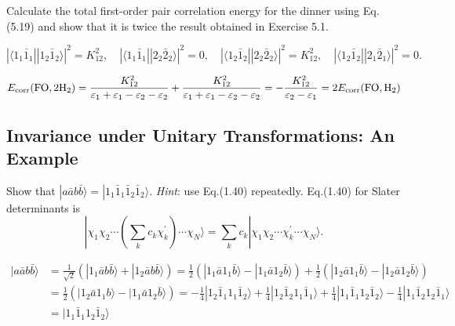 \documentclass[a4paper]{book}
\newcommand{\corr}{{\rm corr}}
\begin{document}
	\begin{exercise}
	Calculate the total first-order pair correlation energy for the dinner using Eq.(5.19) and show that it is twice the result obtained  in Exercise 5.1.
	\end{exercise}
	
	\begin{solution}
	
	\[
		| \langle 1_1 \bar{1}_1 || 1_2 \bar{1}_2 \rangle |^2 = K^2_{12}, \quad | \langle 1_1 \bar{1}_1 || 2_2 \bar{2}_2 \rangle |^2 = 0, \quad | \langle 1_2 \bar{1}_2 || 2_2 \bar{2}_2 \rangle |^2 = K^2_{12}, \quad | \langle 1_2 \bar{1}_2 || 2_1 \bar{2}_1 \rangle |^2 = 0.
	\]
	
	\begin{equation}
		E_\corr( {\rm FO}, 2\ce{H2} ) = \frac{ K^2_{12} }{ \varepsilon_1 + \varepsilon_1 - \varepsilon_2 - \varepsilon_2 } + \frac{ K^2_{12} }{ \varepsilon_1 + \varepsilon_1 - \varepsilon_2 - \varepsilon_2 } = - \frac{ K^2_{12} }{ \varepsilon_2 - \varepsilon_1 } = 2 E_\corr( {\rm FO},\ce{H2} )
	\end{equation}
	
	\end{solution}
	
	\subsection{Invariance under Unitary Transformations: An Example}
	
	\begin{exercise}
	Show that $| a \bar{a} b \bar{b} \rangle = | 1_1 \bar{1}_1 \bar{1}_2 \bar{1}_2 \rangle$. {\it Hint}: use Eq.(1.40) repeatedly. Eq.(1.40) for Slater determinants is
	\[
		| \chi_1 \chi_2 \cdots \left( \sum_{k} c_k \chi^\prime_k \right) \cdots \chi_N \rangle = \sum_k c_k | \chi_1 \chi_2 \cdots \chi^\prime_k \cdots \chi_N \rangle.
	\]
	\end{exercise}
	
	\begin{solution}
	
	\begin{align*}
		| a \bar{a} b \bar{b} \rangle &= \frac{1}{ \sqrt{2} } \left( | 1_1 \bar{a} b \bar{b} \rangle + | 1_2 \bar{a} b \bar{b} \rangle \right) = \frac{1}{2} \left( | 1_1 \bar{a} 1_1 \bar{b} \rangle - | 1_1 \bar{a} 1_2 \bar{b} \rangle \right) + \frac{1}{2} \left( | 1_2 \bar{a} 1_1 \bar{b} \rangle - | 1_2 \bar{a} 1_2 \bar{b} \rangle  \right) \\
		&= \frac{1}{2} \left( | 1_2 \bar{a} 1_1 b \rangle - | 1_1 \bar{a} 1_2 \bar{b} \rangle \right) = -\frac{1}{4} | 1_2 \bar{1}_1 1_1 \bar{1}_2 \rangle + \frac{1}{4} | 1_2 \bar{1}_2 1_1 \bar{1}_1 \rangle + \frac{1}{4} | 1_1 \bar{1}_1 1_2 \bar{1}_2 \rangle - \frac{1}{4} | 1_1 \bar{1}_2 1_2 \bar{1}_1 \rangle \\
		&= | 1_1 \bar{1}_1 1_2 \bar{1}_2 \rangle
	\end{align*}
			
	\end{solution}
	
\end{document}
